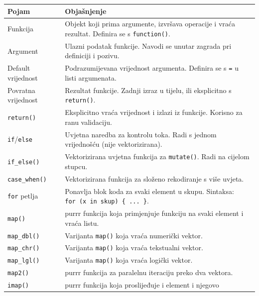 \documentclass[
  croatian,
  letterpaper,
  DIV=11,
  numbers=noendperiod]{scrartcl}
\begin{document}
\begin{longtable}[]{@{}
  >{\raggedright\arraybackslash}p{}
  >{\raggedright\arraybackslash}p{}@{}}
\toprule\noalign{}
\begin{minipage}[b]{\linewidth}\raggedright
Pojam
\end{minipage} & \begin{minipage}[b]{\linewidth}\raggedright
Objašnjenje
\end{minipage} \\
\midrule\noalign{}
\endhead
\bottomrule\noalign{}
\endlastfoot
Funkcija & Objekt koji prima argumente, izvršava operacije i vraća
rezultat. Definira se s \texttt{function()}. \\
Argument & Ulazni podatak funkcije. Navodi se unutar zagrada pri
definiciji i pozivu. \\
Default vrijednost & Podrazumijevana vrijednost argumenta. Definira se s
\texttt{=} u listi argumenata. \\
Povratna vrijednost & Rezultat funkcije. Zadnji izraz u tijelu, ili
eksplicitno s \texttt{return()}. \\
\texttt{return()} & Eksplicitno vraća vrijednost i izlazi iz funkcije.
Korisno za ranu validaciju. \\
\texttt{if}/\texttt{else} & Uvjetna naredba za kontrolu toka. Radi s
jednom vrijednošću (nije vektorizirana). \\
\texttt{if\_else()} & Vektorizirana uvjetna funkcija za
\texttt{mutate()}. Radi na cijelom stupcu. \\
\texttt{case\_when()} & Vektorizirana funkcija za složeno rekodiranje s
više uvjeta. \\
\texttt{for} petlja & Ponavlja blok koda za svaki element u skupu.
Sintaksa: \texttt{for\ (x\ in\ skup)\ \{\ ...\ \}}. \\
\texttt{map()} & purrr funkcija koja primjenjuje funkciju na svaki
element i vraća listu. \\
\texttt{map\_dbl()} & Varijanta \texttt{map()} koja vraća numerički
vektor. \\
\texttt{map\_chr()} & Varijanta \texttt{map()} koja vraća tekstualni
vektor. \\
\texttt{map\_lgl()} & Varijanta \texttt{map()} koja vraća logički
vektor. \\
\texttt{map2()} & purrr funkcija za paralelnu iteraciju preko dva
vektora. \\
\texttt{imap()} & purrr funkcija koja proslijeđuje i element i njegovo

\end{longtable}
\end{document}
